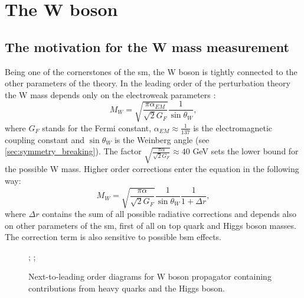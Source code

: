 \chapter{The W boson}
    
    	\section{The motivation for the W mass measurement}    
        Being one of the cornerstones of the \gls{sm}, the W boson is tightly connected to the other parameters of the theory. In the leading order of the perturbation theory the W mass depends only on the electroweak parameters \cite{Awramik}:
        \begin{equation}
        M_W=\sqrt{\frac{\pi \alpha_{EM}}{\sqrt{2}G_F}}\frac{1}{\sin{\theta_W}},
        \end{equation}
        where $G_F$ stands for the Fermi constant, $\alpha_{EM}\approx\frac{1}{137}$ is the electromagnetic coupling constant and $\sin{\theta_W}$ is the Weinberg angle (see \ref{sec:symmetry_breaking}). The factor $\sqrt{\frac{\pi \alpha}{\sqrt{2}G_F}} \approx 40$ GeV sets the lower bound for the possible W mass. Higher order corrections enter the equation in the following way:
        \begin{equation}
        M_W=\sqrt{\frac{\pi \alpha}{\sqrt{2}G_F}}\frac{1}{\sin{\theta_W}}\frac{1}{1+\Delta r},
        \end{equation}
        where $\Delta r $ contains the sum of all possible radiative corrections and depends also on other parameters of the \gls{sm}, first of all on top quark and Higgs boson masses. The correction term is also sensitive to possible \gls{bsm} effects.
        \begin{figure}
        	\label{fig::mw_cor}
        	\centering
        	;
        		\;  \; \; \; 
        	;
        	\caption{ Next-to-leading order diagrams for W boson propagator containing contributions from heavy quarks and the Higgs boson.}
        \end{figure}
